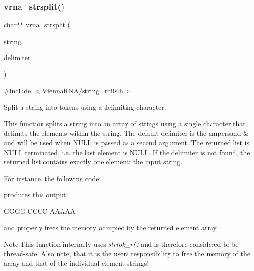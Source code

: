 \subsubsection{\texorpdfstring{vrna\+\_\+strsplit()}{vrna\_strsplit()}}
{\footnotesize\ttfamily char$\ast$$\ast$ vrna\+\_\+strsplit (\begin{DoxyParamCaption}\item[{const char $\ast$}]{string,  }\item[{const char $\ast$}]{delimiter }\end{DoxyParamCaption})}



{\ttfamily \#include $<$\mbox{\hyperlink{string__utils_8h}{Vienna\+R\+N\+A/string\+\_\+utils.\+h}}$>$}



Split a string into tokens using a delimiting character. 

This function splits a string into an array of strings using a single character that delimits the elements within the string. The default delimiter is the ampersand {\ttfamily \textquotesingle{}\&\textquotesingle{}} and will be used when {\ttfamily N\+U\+LL} is passed as a second argument. The returned list is N\+U\+LL terminated, i.\+e. the last element is {\ttfamily N\+U\+LL}. If the delimiter is not found, the returned list contains exactly one element\+: the input string.

For instance, the following code\+:


 produces this output\+:

\begin{DoxyVerb}GGGG
CCCC
AAAAA
\end{DoxyVerb}
 and properly free\textquotesingle{}s the memory occupied by the returned element array.

\begin{DoxyNote}{Note}
This function internally uses {\itshape strtok\+\_\+r()} and is therefore considered to be thread-\/safe. Also note, that it is the users responsibility to free the memory of the array and that of the individual element strings!
\end{DoxyNote}

